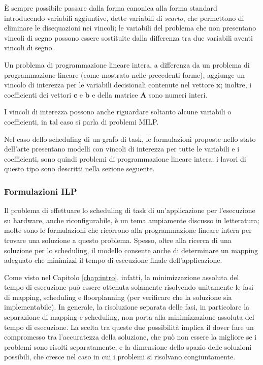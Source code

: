 È sempre possibile passare dalla forma canonica alla forma standard 
introducendo variabili aggiuntive, dette variabili di \emph{scarto}, che 
permettono di eliminare le disequazioni nei vincoli; le variabili del problema 
che non presentano vincoli di segno possono essere sostituite dalla differenza 
tra due variabili aventi vincoli di segno.

Un problema di programmazione lineare intera, a differenza da un problema di 
programmazione lineare (come mostrato nelle precedenti forme), aggiunge un 
vincolo di interezza per le variabili decisionali contenute nel vettore 
$\mathbf{x}$; inoltre, i coefficienti dei vettori $\mathbf{c}$ e $\mathbf{b}$ 
e della matrice $\mathbf{A}$ sono numeri interi.

I vincoli di interezza possono anche riguardare soltanto alcune variabili o 
coefficienti, in tal caso si parla di problemi \ac{MILP}.

Nel caso dello scheduling di un grafo di task, le formulazioni proposte nello 
stato dell'arte presentano modelli con vincoli di interezza per tutte le 
variabili e i coefficienti, sono quindi problemi di programmazione lineare 
intera; i lavori di questo tipo sono descritti nella sezione seguente.


\subsubsection{Formulazioni ILP}
Il problema di effettuare lo scheduling di task di un'applicazione per 
l'esecuzione su hardware, anche riconfigurabile, è un tema ampiamente discusso 
in letteratura; molte sono le formulazioni che ricorrono alla programmazione 
lineare intera per trovare una soluzione a questo problema. Spesso, oltre alla 
ricerca di una soluzione per lo scheduling, il modello consente anche di 
determinare un mapping adeguato che minimizzi il tempo di esecuzione finale
dell'applicazione.

Come visto nel Capitolo \ref{chap:intro}, infatti, la minimizzazione assoluta 
del tempo di esecuzione può essere ottenuta solamente risolvendo unitamente le 
fasi di mapping, scheduling e floorplanning (per verificare che la soluzione 
sia implementabile). In generale, la risoluzione separata delle fasi, in 
particolare la separazione di mapping e scheduling, non porta alla 
minimizzazione assoluta del tempo di esecuzione. La scelta tra queste due 
possibilità implica il dover fare un compromesso tra l'accuratezza della 
soluzione, che può non essere la migliore se i problemi sono risolti 
separatamente, e la dimensione dello spazio delle soluzioni possibili, che 
cresce nel caso in cui i problemi si risolvano congiuntamente.

